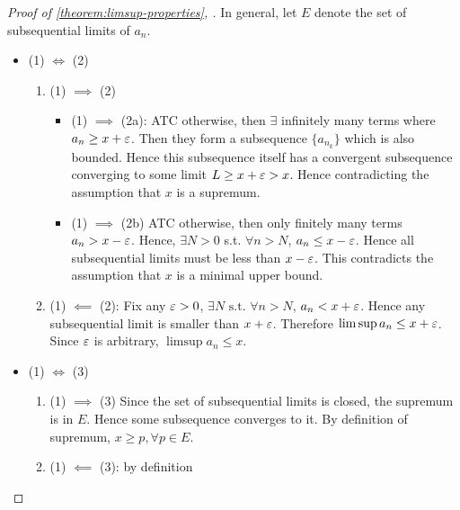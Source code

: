 \begin{proof}[Proof of 
        \ref{theorem:limsup-properties},
    ]
    In general, let $E$ denote the 
    set of subsequential limits of $a_n$.
    \begin{itemize}
        \item (1) $\iff$ (2)
        \begin{enumerate}
            \item (1) $\implies$ (2)
            \begin{itemize}
                \item (1) $\implies$ (2a): ATC otherwise,
                then $\exists$ infinitely many terms
                where $a_n \geq x + \varepsilon$.
                Then they form a subsequence $ \{ a_{n_k} \} $
                which is also bounded. 
                Hence this subsequence itself has a convergent
                subsequence converging to some
                limit $L \geq x + \varepsilon > x$. 
                Hence contradicting the assumption
                that $x$ is a supremum.
                \item (1) $\implies$ (2b)
                ATC otherwise, then only finitely many terms
                $a_n > x - \varepsilon$. Hence,
                $\exists N >0$ s.t. $\forall n > N$,
                $a_n \leq x - \varepsilon$. Hence 
                all subsequential limits must be less 
                than $x - \varepsilon$. This contradicts
                the assumption that $x$ is a minimal upper bound.
            \end{itemize} 
            \item (1) $\impliedby$ (2): Fix any $\varepsilon > 0$, 
            $\exists N \text{ s.t. } \forall n > N$,
            $a_n < x + \varepsilon$.
            Hence any subsequential limit is smaller than $x + \varepsilon$.
            Therefore $\limsup a_n \leq x + \varepsilon$. Since
            $\varepsilon$ is arbitrary, $\limsup a_n \leq x$.
        \end{enumerate}
        \item (1) $\iff$ (3)
        \begin{enumerate}
            \item (1) $\implies$ (3)
            Since the set of subsequential limits is closed,
            the supremum is in $E$. Hence
            some subsequence converges to it. 
            By definition of supremum, $x \geq p, \forall p \in E$.
            \item (1) $\impliedby$ (3): by definition
        \end{enumerate} 

\end{itemize}
\end{proof}
